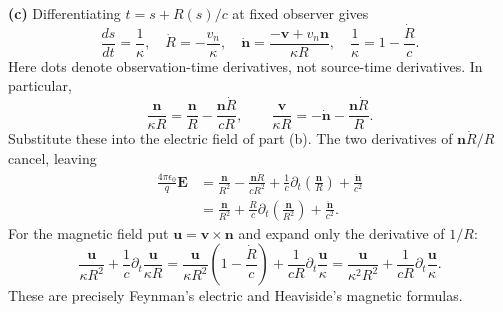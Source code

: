 \textbf{(c)} Differentiating $t=s+R(s)/c$ at fixed observer gives
\[
\frac{ds}{dt}=\frac1\kappa,\quad
\dot R=-\frac{v_n}\kappa,\quad
\dot{\mathbf n}=\frac{-\mathbf v+v_n\mathbf n}{\kappa R},\quad
\frac1\kappa=1-\frac{\dot R}c.
\]
Here dots denote observation-time derivatives, not source-time derivatives.
In particular,
\[
\frac{\mathbf n}{\kappa R}=\frac{\mathbf n}R-\frac{\mathbf n\dot R}{cR},
\qquad
\frac{\mathbf v}{\kappa R}=-\dot{\mathbf n}-\frac{\mathbf n\dot R}R.
\]
Substitute these into the electric field of part (b). The two derivatives
of $\mathbf n\dot R/R$ cancel, leaving
\begin{align*}
\frac{4\pi\epsilon_0}q\mathbf E
&=\frac{\mathbf n}{R^2}-\frac{\mathbf n\dot R}{cR^2}
+\frac1c\partial_t\left(\frac{\mathbf n}R\right)
+\frac{\ddot{\mathbf n}}{c^2}\\
&=\frac{\mathbf n}{R^2}+\frac Rc\partial_t\left(\frac{\mathbf n}{R^2}\right)
+\frac{\ddot{\mathbf n}}{c^2}.
\end{align*}
For the magnetic field put $\mathbf u=\mathbf v\times\mathbf n$ and expand
only the derivative of $1/R$:
\[
\frac{\mathbf u}{\kappa R^2}+\frac1c\partial_t\frac{\mathbf u}{\kappa R}
=\frac{\mathbf u}{\kappa R^2}\left(1-\frac{\dot R}c\right)
+\frac1{cR}\partial_t\frac{\mathbf u}\kappa
=\frac{\mathbf u}{\kappa^2R^2}+\frac1{cR}\partial_t\frac{\mathbf u}\kappa.
\]
These are precisely Feynman's electric and Heaviside's magnetic formulas.


